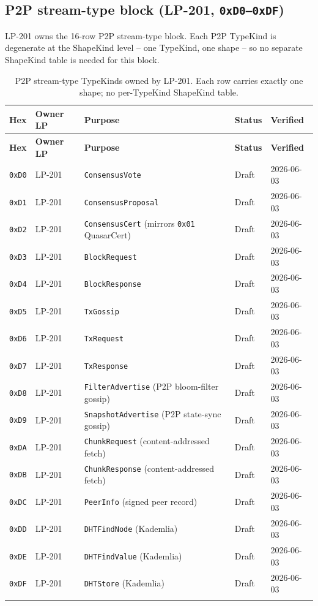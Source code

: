 \subsection{P2P stream-type block (LP-201, \texttt{0xD0--0xDF})}

LP-201 owns the 16-row P2P stream-type block. Each P2P TypeKind is
degenerate at the ShapeKind level -- one TypeKind, one shape -- so
no separate ShapeKind table is needed for this block.

\begin{longtable}{@{}p{1.9cm}p{1.4cm}p{6.7cm}p{1.4cm}p{1.6cm}@{}}
\toprule
\textbf{Hex} & \textbf{Owner LP} & \textbf{Purpose} & \textbf{Status} & \textbf{Verified} \\
\midrule
\endfirsthead
\toprule
\textbf{Hex} & \textbf{Owner LP} & \textbf{Purpose} & \textbf{Status} & \textbf{Verified} \\
\midrule
\endhead
\texttt{0xD0} & LP-201 & \texttt{ConsensusVote} & Draft & 2026-06-03 \\
\texttt{0xD1} & LP-201 & \texttt{ConsensusProposal} & Draft & 2026-06-03 \\
\texttt{0xD2} & LP-201 & \texttt{ConsensusCert} (mirrors \texttt{0x01} QuasarCert) & Draft & 2026-06-03 \\
\texttt{0xD3} & LP-201 & \texttt{BlockRequest} & Draft & 2026-06-03 \\
\texttt{0xD4} & LP-201 & \texttt{BlockResponse} & Draft & 2026-06-03 \\
\texttt{0xD5} & LP-201 & \texttt{TxGossip} & Draft & 2026-06-03 \\
\texttt{0xD6} & LP-201 & \texttt{TxRequest} & Draft & 2026-06-03 \\
\texttt{0xD7} & LP-201 & \texttt{TxResponse} & Draft & 2026-06-03 \\
\texttt{0xD8} & LP-201 & \texttt{FilterAdvertise} (P2P bloom-filter gossip) & Draft & 2026-06-03 \\
\texttt{0xD9} & LP-201 & \texttt{SnapshotAdvertise} (P2P state-sync gossip) & Draft & 2026-06-03 \\
\texttt{0xDA} & LP-201 & \texttt{ChunkRequest} (content-addressed fetch) & Draft & 2026-06-03 \\
\texttt{0xDB} & LP-201 & \texttt{ChunkResponse} (content-addressed fetch) & Draft & 2026-06-03 \\
\texttt{0xDC} & LP-201 & \texttt{PeerInfo} (signed peer record) & Draft & 2026-06-03 \\
\texttt{0xDD} & LP-201 & \texttt{DHTFindNode} (Kademlia) & Draft & 2026-06-03 \\
\texttt{0xDE} & LP-201 & \texttt{DHTFindValue} (Kademlia) & Draft & 2026-06-03 \\
\texttt{0xDF} & LP-201 & \texttt{DHTStore} (Kademlia) & Draft & 2026-06-03 \\
\bottomrule
\caption{P2P stream-type TypeKinds owned by LP-201. Each row carries
exactly one shape; no per-TypeKind ShapeKind table.}
\label{tab:typekind-lp201}
\end{longtable}

